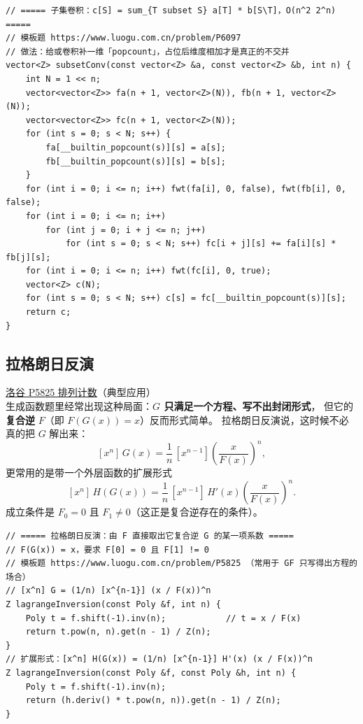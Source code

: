 		\begin{verbatim}
// ===== 子集卷积：c[S] = sum_{T subset S} a[T] * b[S\T]，O(n^2 2^n) =====
// 模板题 https://www.luogu.com.cn/problem/P6097
// 做法：给或卷积补一维「popcount」，占位后维度相加才是真正的不交并
vector<Z> subsetConv(const vector<Z> &a, const vector<Z> &b, int n) {
    int N = 1 << n;
    vector<vector<Z>> fa(n + 1, vector<Z>(N)), fb(n + 1, vector<Z>(N));
    vector<vector<Z>> fc(n + 1, vector<Z>(N));
    for (int s = 0; s < N; s++) {
        fa[__builtin_popcount(s)][s] = a[s];
        fb[__builtin_popcount(s)][s] = b[s];
    }
    for (int i = 0; i <= n; i++) fwt(fa[i], 0, false), fwt(fb[i], 0, false);
    for (int i = 0; i <= n; i++)
        for (int j = 0; i + j <= n; j++)
            for (int s = 0; s < N; s++) fc[i + j][s] += fa[i][s] * fb[j][s];
    for (int i = 0; i <= n; i++) fwt(fc[i], 0, true);
    vector<Z> c(N);
    for (int s = 0; s < N; s++) c[s] = fc[__builtin_popcount(s)][s];
    return c;
}
		\end{verbatim}

		\subsection{拉格朗日反演}

		\href{https://www.luogu.com.cn/problem/P5825}{洛谷 P5825 排列计数}（典型应用） \\

		生成函数题里经常出现这种局面：\textbf{$G$ 只满足一个方程、写不出封闭形式}，
		但它的\textbf{复合逆} $F$（即 $F(G(x)) = x$）反而形式简单。
		拉格朗日反演说，这时候不必真的把 $G$ 解出来：
		\[
			[x^n]\,G(x) = \frac1n\,[x^{n-1}]\left(\frac{x}{F(x)}\right)^{n},
		\]
		更常用的是带一个外层函数的扩展形式
		\[
			[x^n]\,H(G(x)) = \frac1n\,[x^{n-1}]\,H'(x)\left(\frac{x}{F(x)}\right)^{n}.
		\]
		成立条件是 $F_0 = 0$ 且 $F_1 \neq 0$（这正是复合逆存在的条件）。

		\begin{verbatim}
// ===== 拉格朗日反演：由 F 直接取出它复合逆 G 的某一项系数 =====
// F(G(x)) = x，要求 F[0] = 0 且 F[1] != 0
// 模板题 https://www.luogu.com.cn/problem/P5825 （常用于 GF 只写得出方程的场合）
// [x^n] G = (1/n) [x^{n-1}] (x / F(x))^n
Z lagrangeInversion(const Poly &f, int n) {
    Poly t = f.shift(-1).inv(n);            // t = x / F(x)
    return t.pow(n, n).get(n - 1) / Z(n);
}
// 扩展形式：[x^n] H(G(x)) = (1/n) [x^{n-1}] H'(x) (x / F(x))^n
Z lagrangeInversion(const Poly &f, const Poly &h, int n) {
    Poly t = f.shift(-1).inv(n);
    return (h.deriv() * t.pow(n, n)).get(n - 1) / Z(n);
}
		\end{verbatim}

